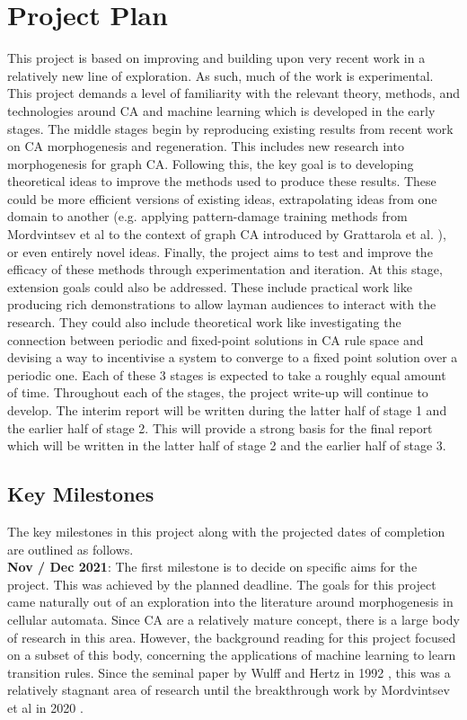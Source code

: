 \chapter{Project Plan}

This project is based on improving and building upon very recent work in a relatively new line of exploration.
As such, much of the work is experimental.
This project demands a level of familiarity with the relevant theory, methods, and technologies around CA and machine learning which is developed in the early stages.
The middle stages begin by reproducing existing results from recent work on CA morphogenesis and regeneration. This includes new research into morphogenesis for graph CA. 
Following this, the key goal is to developing theoretical ideas to improve the methods used to produce these results. These could be more efficient versions of existing ideas, extrapolating ideas from one domain to another (e.g. applying pattern-damage training methods from Mordvintsev et al \cite{mordvintsev2020growing} to the context of graph CA introduced by Grattarola et al. \cite{grattarola2021learning}), or even entirely novel ideas.
Finally, the project aims to test and improve the efficacy of these methods through experimentation and iteration. 
At this stage, extension goals could also be addressed. 
These include practical work like producing rich demonstrations to allow layman audiences to interact with the research. 
They could also include theoretical work like investigating the connection between periodic and fixed-point solutions in CA rule space and devising a way to incentivise a system to converge to a fixed point solution over a periodic one.
Each of these 3 stages is expected to take a roughly equal amount of time.
Throughout each of the stages, the project write-up will continue to develop.
The interim report will be written during the latter half of stage 1 and the earlier half of stage 2.
This will provide a strong basis for the final report which will be written in the latter half of stage 2 and the earlier half of stage 3.

\section{Key Milestones}
The key milestones in this project along with the projected dates of completion are outlined as follows.\\

\textbf{Nov / Dec 2021}: The first milestone is to decide on specific aims for the project. 
This was achieved by the planned deadline. 
The goals for this project came naturally out of an exploration into the literature around morphogenesis in cellular automata.
Since CA are a relatively mature concept, there is a large body of research in this area.
However, the background reading for this project focused on a subset of this body, concerning the applications of machine learning to learn transition rules.
Since the seminal paper by Wulff and Hertz in 1992 \cite{wulff1992learning}, this was a relatively stagnant area of research until the breakthrough work by Mordvintsev et al in 2020 \cite{mordvintsev2020growing}.

